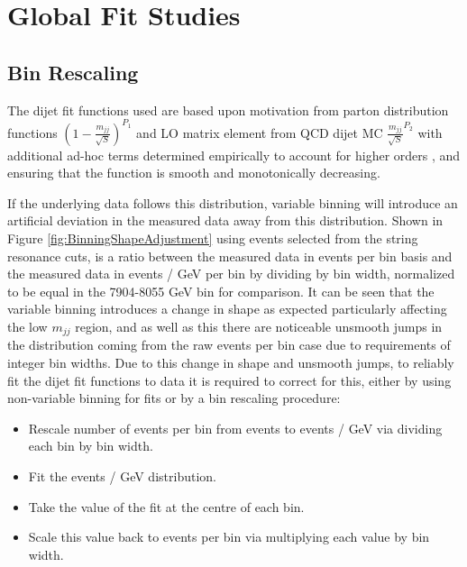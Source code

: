 \section{Global Fit Studies}
\subsection{Bin Rescaling}
The dijet fit functions used are based upon motivation from parton distribution functions $\left(1-\frac{m_{jj}}{\sqrt{S}}\right)^{P_{1}}$ and LO matrix element from QCD dijet MC $\frac{m_{jj}}{\sqrt{S}}^{P_{2}}$ with additional ad-hoc terms determined empirically to account for higher orders \cite{ATL-COM-PHYS-2018-161}, and ensuring that the function is smooth and monotonically decreasing. 

If the underlying data follows this distribution, variable binning will introduce an artificial deviation in the measured data away from this distribution. Shown in Figure \ref{fig:BinningShapeAdjustment} using events selected from the string resonance cuts, is a ratio between the measured data in events per bin basis and the measured data in events / GeV per bin by dividing by bin width, normalized to be equal in the 7904-8055 GeV bin for comparison. It can be seen that the variable binning introduces a change in shape as expected particularly affecting the low $m_{jj}$ region, and as well as this there are noticeable unsmooth jumps in the distribution coming from the raw events per bin case due to requirements of integer bin widths. Due to this change in shape and unsmooth jumps, to reliably fit the dijet fit functions to data it is required to correct for this, either by using non-variable binning for fits or by a bin rescaling procedure:

\begin{itemize}
    \item Rescale number of events per bin from events to events / GeV via dividing each bin by bin width.
    \item Fit the events / GeV distribution.
    \item Take the value of the fit at the centre of each bin.
    \item Scale this value back to events per bin via multiplying each value by bin width.
\end{itemize}

